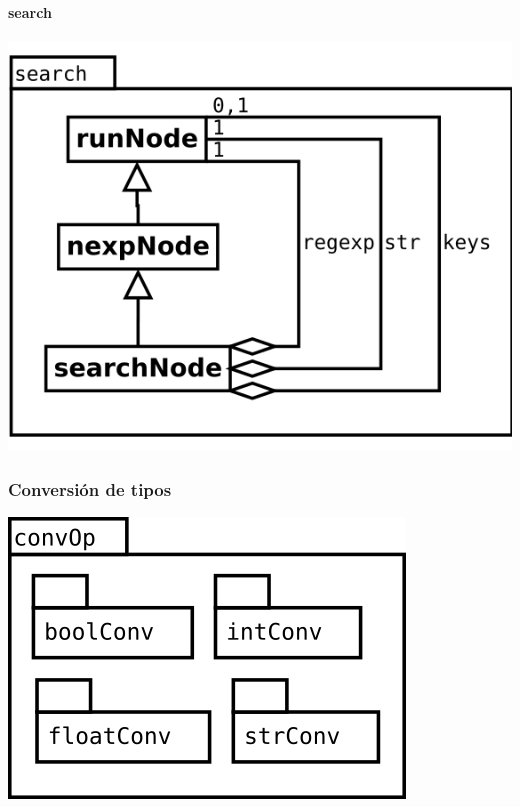 \paragraph {search}
\begin{center}
\includegraphics[scale=0.4]{search.png} \\
\end{center}

\pagebreak
\subsubsection {Conversión de tipos}
\begin{center}
\includegraphics[scale=0.4]{convOp-package.png} \\
\end{center}

